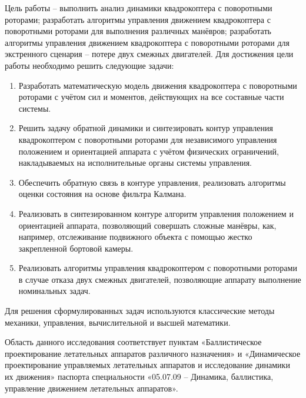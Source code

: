 Цель работы -- выполнить анализ динамики квадрокоптера с поворотными роторами;
разработать алгоритмы управления движением квадрокоптера с поворотными роторами для выполнения различных манёвров; разработать алгоритмы управления движением квадрокоптера с поворотными роторами для экстренного сценария -- потере двух смежных двигателей. Для достижения цели работы необходимо решить следующие задачи:
\begin{enumerate}
	\item Разработать математическую модель движения квадрокоптера с поворотными роторами с учётом сил и моментов, действующих на все составные части системы.
	\item Решить задачу обратной динамики и синтезировать контур управления квадрокоптером с поворотными роторами для независимого управления положением и ориентацией аппарата с учётом физических ограничений, накладываемых на исполнительные органы системы управления.
	\item Обеспечить обратную связь в контуре управления, реализовать алгоритмы оценки состояния на основе фильтра Калмана.
	\item Реализовать в синтезированном контуре алгоритм управления положением и ориентацией аппарата, позволяющий совершать сложные манёвры, как, например, отслеживание подвижного объекта с помощью жестко закрепленной бортовой камеры.
	\item Реализовать алгоритмы управления квадрокоптером с поворотными роторами в случае отказа двух смежных двигателей, позволяющие аппарату выполнение номинальных задач.
\end{enumerate}
Для решения сформулированных задач используются классические методы механики, управления, вычислительной и высшей математики.

Область данного исследования соответствует пунктам «Баллистическое проектирование летательных аппаратов различного назначения» и «Динамическое проектирование управляемых летательных аппаратов и исследование динамики их движения» паспорта специальности «05.07.09 – Динамика, баллистика, управление движением летательных аппаратов».


